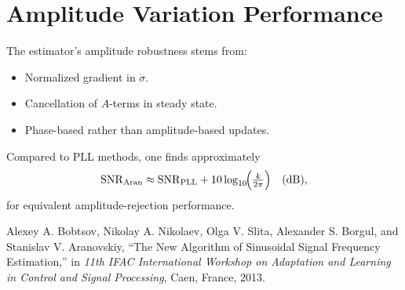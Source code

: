 \documentclass[11pt,letterpaper]{article}
\begin{document}
\section{Amplitude Variation Performance}

The estimator’s amplitude robustness stems from:
\begin{itemize}
  \item Normalized gradient in \(\dot{\sigma}\).
  \item Cancellation of \(A\)-terms in steady state.
  \item Phase-based rather than amplitude-based updates.
\end{itemize}

Compared to PLL methods, one finds approximately
\[
\mathrm{SNR}_{\text{Aran}} 
\approx \mathrm{SNR}_{\text{PLL}} 
+ 10\log_{10}\!\Bigl(\tfrac{k}{2\pi}\Bigr)
\quad\text{(dB)},
\]
for equivalent amplitude-rejection performance.

\begin{thebibliography}{9}
Alexey A. Bobtsov, Nikolay A. Nikolaev, Olga V. Slita, Alexander S. Borgul, and Stanislav V. Aranovskiy, 
``The New Algorithm of Sinusoidal Signal Frequency Estimation,'' 
in \emph{11th IFAC International Workshop on Adaptation and Learning in Control and Signal Processing}, 
Caen, France, 2013.
\end{thebibliography}
\end{document}
